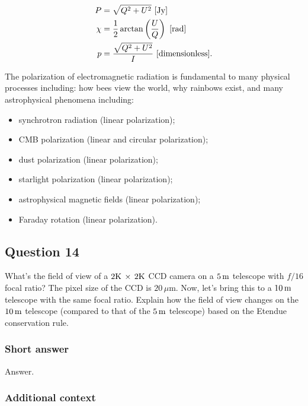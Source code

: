 \documentclass[a4paper,10pt]{article}
\begin{document}
\begin{align*}
    P &= \sqrt{Q^2+U^2} ~ [{\rm Jy}] \\
    \chi &= \frac{1}{2} \arctan \left(\frac{U}{Q}\right) ~ [{\rm rad}] \\
    p &= \frac{\sqrt{Q^2+U^2}}{I} ~ [{\rm dimensionless}].
\end{align*}

The polarization of electromagnetic radiation is fundamental to many physical processes including: how bees view the world, why rainbows exist, and many astrophysical phenomena including:

\begin{itemize}
    \item synchrotron radiation (linear polarization);
    \item CMB polarization (linear and circular polarization);
    \item dust polarization (linear polarization);
    \item starlight polarization (linear polarization);
    \item astrophysical magnetic fields (linear polarization);
    \item Faraday rotation (linear polarization).
\end{itemize}



\newpage
\subsection{Question 14}

What's the field of view of a $2{\rm K}\,\times\,2{\rm K}$ CCD camera on a $5\,{\rm m}$ telescope with $f/16$ focal ratio? The pixel size of the CCD is $20\,\mu$m. Now, let’s bring this to a $10\,{\rm m}$ telescope with the same focal ratio. Explain how the field of view changes on the $10\,{\rm m}$ telescope (compared to that of the $5\,{\rm m}$ telescope) based on the Etendue conservation rule.

\subsubsection{Short answer}

Answer.

\subsubsection{Additional context}
\end{document}
